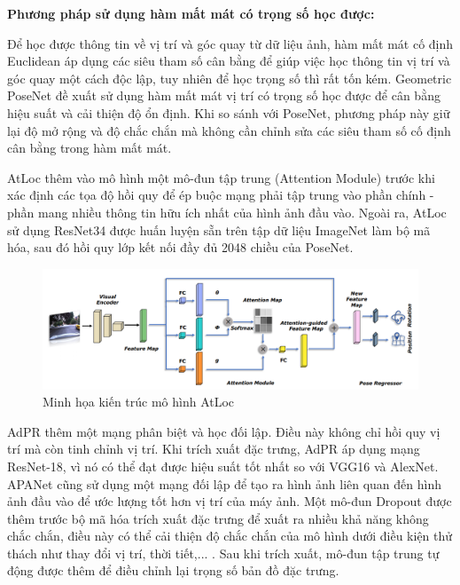 \noindent\textbf{Phương pháp sử dụng hàm mất mát có trọng số học được:}

Để học được thông tin về vị trí và góc quay từ dữ liệu ảnh, hàm mất mát cố định Euclidean áp dụng các siêu tham số cân bằng để giúp việc học thông tin vị trí và góc quay một cách độc lập, tuy nhiên để học trọng số thì rất tốn kém. Geometric PoseNet \cite{kendall2017geometric} đề xuất sử dụng hàm mất mát vị trí có trọng số học được để cân bằng hiệu suất và cải thiện độ ổn định. Khi so sánh với PoseNet, phương pháp này giữ lại độ mở rộng và độ chắc chắn mà không cần chỉnh sửa các siêu tham số cố định cân bằng trong hàm mất mát. 

AtLoc \cite{wang2019atloc} thêm vào mô hình một mô-đun tập trung (Attention Module) trước khi xác định các tọa độ hồi quy để ép buộc mạng phải tập trung vào phần chính - phần mang nhiều thông tin hữu ích nhất của hình ảnh đầu vào. Ngoài ra, AtLoc sử dụng ResNet34 được huấn luyện sẵn trên tập dữ liệu ImageNet làm bộ mã hóa, sau đó hồi quy lớp kết nối đầy đủ 2048 chiều của PoseNet. 
\begin{figure}[H]
    \centering
    \includegraphics[width=\textwidth]{pics/Chapter2/atloc.png}
    \caption{Minh họa kiến trúc mô hình AtLoc \cite{wang2019atloc}}
\end{figure}
AdPR \cite{bui2019adversarial} thêm một mạng phân biệt và học đối lập. Điều này không chỉ hồi quy vị trí mà còn tinh chỉnh vị trí. Khi trích xuất đặc trưng, AdPR áp dụng mạng ResNet-18, vì nó có thể đạt được hiệu suất tốt nhất so với VGG16 và AlexNet. APANet \cite{chidlovskii2020adversarial} cũng sử dụng một mạng đối lập để tạo ra hình ảnh liên quan đến hình ảnh đầu vào để ước lượng tốt hơn vị trí của máy ảnh. Một mô-đun Dropout được thêm trước bộ mã hóa trích xuất đặc trưng để xuất ra nhiều khả năng không chắc chắn, điều này có thể cải thiện độ chắc chắn của mô hình dưới điều kiện thử thách như thay đổi vị trí, thời tiết,... . Sau khi trích xuất, mô-đun tập trung tự động được thêm để điều chỉnh lại trọng số bản đồ đặc trưng.
